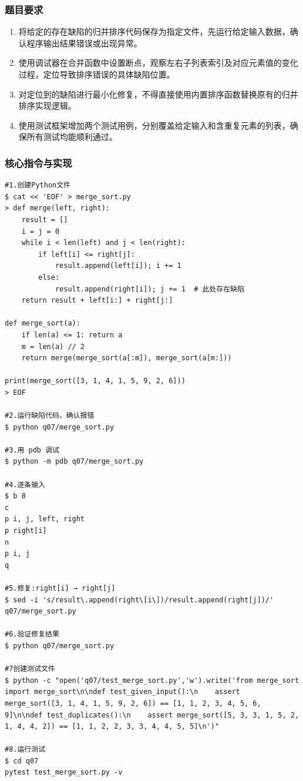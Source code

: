 \documentclass[12pt,a4paper]{article}
\begin{document}
\subsubsection{题目要求}
\begin{enumerate}[leftmargin=2em]
\item 将给定的存在缺陷的归并排序代码保存为指定文件，先运行给定输入数据，确认程序输出结果错误或出现异常。
\item 使用调试器在合并函数中设置断点，观察左右子列表索引及对应元素值的变化过程，定位导致排序错误的具体缺陷位置。
\item 对定位到的缺陷进行最小化修复，不得直接使用内置排序函数替换原有的归并排序实现逻辑。
\item 使用测试框架增加两个测试用例，分别覆盖给定输入和含重复元素的列表，确保所有测试均能顺利通过。
\end{enumerate}

\subsubsection{核心指令与实现}
\begin{lstlisting}[caption={实验三关键 Shell 指令}]
#1.创建Python文件
$ cat << 'EOF' > merge_sort.py
> def merge(left, right):
    result = []
    i = j = 0
    while i < len(left) and j < len(right):
        if left[i] <= right[j]:
            result.append(left[i]); i += 1
        else:
            result.append(right[i]); j += 1  # 此处存在缺陷
    return result + left[i:] + right[j:]

def merge_sort(a):
    if len(a) <= 1: return a
    m = len(a) // 2
    return merge(merge_sort(a[:m]), merge_sort(a[m:]))

print(merge_sort([3, 1, 4, 1, 5, 9, 2, 6]))
> EOF

#2.运行缺陷代码，确认报错
$ python q07/merge_sort.py

#3.用 pdb 调试
$ python -m pdb q07/merge_sort.py

#4.逐条输入
$ b 8
c
p i, j, left, right
p right[i]
n
p i, j
q

#5.修复:right[i] → right[j]
$ sed -i 's/result\.append(right\[i\])/result.append(right[j])/' q07/merge_sort.py

#6.验证修复结果
$ python q07/merge_sort.py

#7创建测试文件
$ python -c "open('q07/test_merge_sort.py','w').write('from merge_sort import merge_sort\n\ndef test_given_input():\n    assert merge_sort([3, 1, 4, 1, 5, 9, 2, 6]) == [1, 1, 2, 3, 4, 5, 6, 9]\n\ndef test_duplicates():\n    assert merge_sort([5, 3, 3, 1, 5, 2, 1, 4, 4, 2]) == [1, 1, 2, 2, 3, 3, 4, 4, 5, 5]\n')"

#8.运行测试
$ cd q07
pytest test_merge_sort.py -v
\end{lstlisting}
\end{document}
